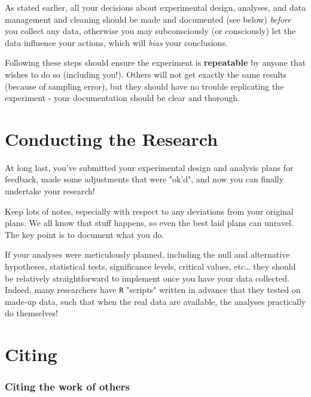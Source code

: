 \documentclass[
]{book}
\begin{document}
As stated earlier, all your decisions about experimental design, analyses, and data management and cleaning should be made and documented (see below) \emph{before} you collect any data, otherwise you may subconsciously (or consciously) let the data influence your actions, which will \emph{bias} your conclusions.

Following these steps should ensure the experiment is \textbf{repeatable} by anyone that wishes to do so (including you!). Others will not get exactly the same results (because of sampling error), but they should have no trouble replicating the experiment - your documentation should be clear and thorough.

\hypertarget{conducting-the-research}{%
\chapter*{Conducting the Research}\label{conducting-the-research}}

At long last, you've submitted your experimental design and analysis plans for feedback, made some adjustments that were "ok'd", and now you can finally undertake your research!

Keep lots of notes, especially with respect to any deviations from your original plans. We all know that stuff happens, so even the best laid plans can unravel. The key point is to document what you do.

If your analyses were meticulously planned, including the null and alternative hypotheses, statistical tests, significance levels, critical values, etc\ldots{} they should be relatively straightforward to implement once you have your data collected. Indeed, many researchers have \texttt{R} "scripts" written in advance that they tested on made-up data, such that when the real data are available, the analyses practically do themselves!

\hypertarget{citing}{%
\chapter*{Citing}\label{citing}}

\hypertarget{citing-the-work-of-others}{%
\subsection*{Citing the work of others}\label{citing-the-work-of-others}}
\end{document}

